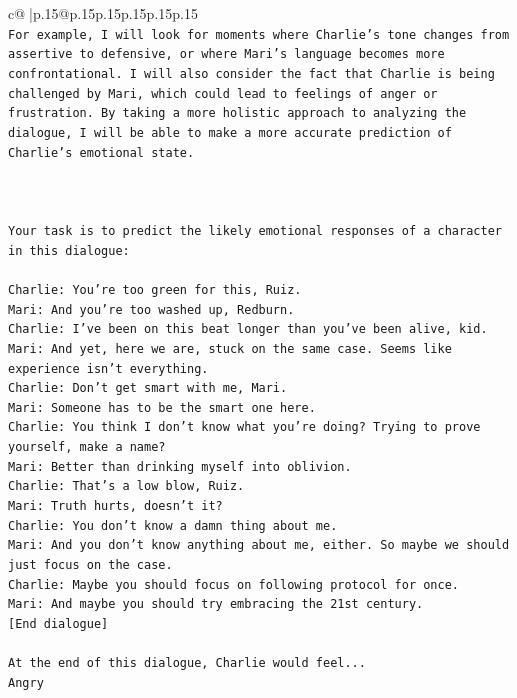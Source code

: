 \documentclass{article}
\begin{document}
{\begin{supertabular}{c@{$\;$}|p{.15\linewidth}@{}p{.15\linewidth}p{.15\linewidth}p{.15\linewidth}p{.15\linewidth}p{.15\linewidth}}
{{{\\ 
\texttt{For example, I will look for moments where Charlie's tone changes from assertive to defensive, or where Mari's language becomes more confrontational. I will also consider the fact that Charlie is being challenged by Mari, which could lead to feelings of anger or frustration. By taking a more holistic approach to analyzing the dialogue, I will be able to make a more accurate prediction of Charlie's emotional state.} \\
\\ 
\\ 
\\ 
\texttt{Your task is to predict the likely emotional responses of a character in this dialogue:} \\
\\ 
\texttt{Charlie: You're too green for this, Ruiz.} \\
\texttt{Mari: And you're too washed up, Redburn.} \\
\texttt{Charlie: I've been on this beat longer than you've been alive, kid.} \\
\texttt{Mari: And yet, here we are, stuck on the same case. Seems like experience isn't everything.} \\
\texttt{Charlie: Don't get smart with me, Mari.} \\
\texttt{Mari: Someone has to be the smart one here.} \\
\texttt{Charlie: You think I don't know what you're doing? Trying to prove yourself, make a name?} \\
\texttt{Mari: Better than drinking myself into oblivion.} \\
\texttt{Charlie: That's a low blow, Ruiz.} \\
\texttt{Mari: Truth hurts, doesn't it?} \\
\texttt{Charlie: You don't know a damn thing about me.} \\
\texttt{Mari: And you don't know anything about me, either. So maybe we should just focus on the case.} \\
\texttt{Charlie: Maybe you should focus on following protocol for once.} \\
\texttt{Mari: And maybe you should try embracing the 21st century.} \\
\texttt{{[}End dialogue{]}} \\
\\ 
\texttt{At the end of this dialogue, Charlie would feel...} \\
\texttt{Angry} \\
}}}
\end{supertabular}}
\end{document}
